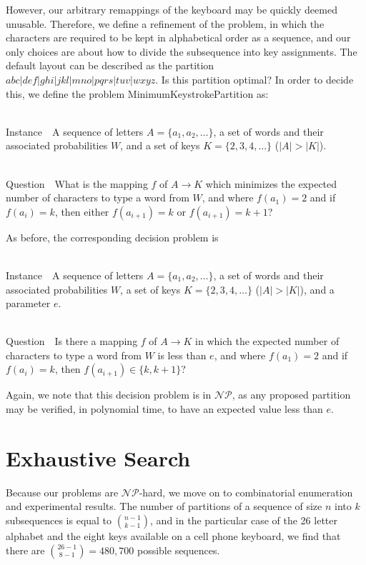 \documentclass[runningheads]{llncs}
\newcommand{\NP}{\ensuremath{\mathcal{NP}}}
\newcommand{\Instance}{{\sc Instance~}}
\newcommand{\Question}{~\\
{\sc Question~}}
\begin{document}
However, our arbitrary remappings of the keyboard may be quickly deemed unusable.  Therefore, we define a refinement of the problem, in which the characters are required to be kept in alphabetical order as a sequence, and our only choices are about how to divide the subsequence into key assignments.  The default layout can be described as the partition $abc|def|ghi|jkl|mno|pqrs|tuv|wxyz$.  Is this partition optimal?  In order to decide this, we define the problem {\sc MinimumKeystrokePartition} as:
\begin{prob}[{\sc MinimumKeystrokePartition}]~\\
\label{thm:minpartition}
\Instance\ A sequence of letters $A = \{a_1, a_2, \ldots \}$, a set of words and their associated probabilities $W$, and a set of keys $K = \{2, 3, 4, \ldots \}$ ($|A| > |K|$).

\Question\ What is the mapping $f$ of $A \to K$ which minimizes the expected number of characters to type a word from $W$, and where $f(a_1) = 2$ and if $f(a_i) = k$, then either $f(a_{i+1}) = k$ or $f(a_{i+1}) = k+1$?
\end{prob}

As before, the corresponding decision problem is
\begin{prob}~\\
\Instance\ A sequence of letters $A = \{a_1, a_2, \ldots \}$, a set of words and their associated probabilities $W$, a set of keys $K = \{2, 3, 4, \ldots \}$ ($|A| > |K|$), and a parameter $e$.

\Question\ Is there a mapping $f$ of $A \to K$ in which the expected number of characters to type a word from $W$ is less than $e$, and where $f(a_1) = 2$ and if $f(a_i) = k$, then $f(a_{i+1}) \in \{k, k+1\}$?
\end{prob}

Again, we note that this decision problem is in \NP, as any proposed partition may be verified, in polynomial time, to have an expected value less than $e$.

\section{Exhaustive Search}

Because our problems are \NP-hard, we move on to combinatorial enumeration and experimental results.  The number of partitions of a sequence of size $n$ into $k$ subsequences is equal to $\binom{n-1}{k-1}$, and in the particular case of the 26 letter alphabet and the eight keys available on a cell phone keyboard, we find that there are $\binom{26-1}{8-1} = 480,700$ possible sequences.



\end{document}
